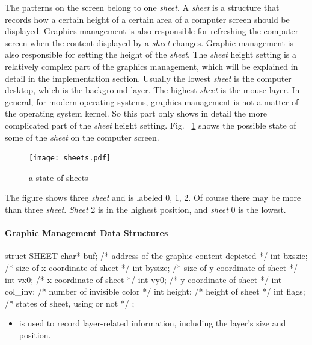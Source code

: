 \documentclass{swfcthesis}
\begin{document}
The patterns on the screen belong to one \emph{sheet}. A \emph{sheet} is a structure that
records how a certain height of a certain area of a computer screen should be
displayed. Graphics management is also responsible for refreshing the computer screen when
the content displayed by a \emph{sheet} changes. Graphic management is also responsible
for setting the height of the \emph{sheet}. The \emph{sheet} height setting is a relatively
complex part of the graphics management, which will be explained in detail in the
implementation section. Usually the lowest \emph{sheet} is the computer desktop, which is the
background layer. The highest \emph{sheet} is the mouse layer. In general, for modern
operating systems, graphics management is not a matter of the operating system kernel. So
this part only shows in detail the more complicated part of the \emph{sheet} height
setting. Fig. ~\ref{fig:state-sheets} shows the possible state of some of the \emph{sheet}
on the computer screen.
\begin{figure}[!ht]
  \centering
  \texttt{[image: sheets.pdf]}
  \caption{a state of sheets}
  \label{fig:state-sheets}
\end{figure}
The figure shows three \emph{sheet} and is labeled 0, 1, 2. Of course there may be more
than three \emph{sheet}. \emph{Sheet} 2 is in the highest position, and \emph{sheet} 0 is
the lowest.


  
\paragraph{Graphic Management Data Structures}

\begin{codeblock}[1]
\begin{ccode}
struct SHEET
{ 
  char* buf;   /* address of the graphic content depicted */
  int bxszie;  /* size of x coordinate of sheet */
  int bysize;  /* size of y coordinate of sheet */
  int vx0;     /* x coordinate of sheet */
  int vy0;     /* y coordinate of sheet */
  int col_inv; /* number of invisible color */
  int height;  /* height of sheet */
  int flags;   /* states of sheet, using or not */
};
\end{ccode}
\end{codeblock}
\begin{itemize}
\item is used to record layer-related information, including the layer's size and
  position.
\end{itemize}
\end{document}
